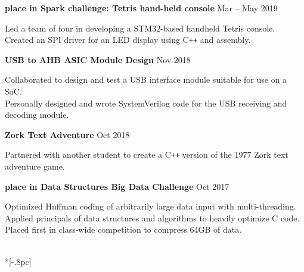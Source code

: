 \documentclass{article}
\begin{document}
\vspace{-5pt}
{\bf {} place in Spark challenge: Tetris hand-held console} \hfill Mar -- May 2019\\
\vspace{-10pt}
\begin{adjustwidth}{20pt}{}
Led a team of four in developing a STM32-based handheld Tetris console. Created an SPI driver for an LED display using C\texttt{++} and assembly.\\
\end{adjustwidth}
\vspace{-5pt}

\vspace{-5pt}
{\bf USB to AHB ASIC Module Design} \hfill Nov 2018\\
\vspace{-10pt}
\begin{adjustwidth}{20pt}{}
Collaborated to design and test a USB interface module suitable for use on a SoC.\\
Personally designed and wrote SystemVerilog code for the USB receiving and decoding module.\\
\end{adjustwidth}
\vspace{-5pt}

\vspace{-5pt}
{\bf Zork Text Adventure} \hfill Oct 2018\\
\vspace{-10pt}
\begin{adjustwidth}{20pt}{}
Partnered with another student to create a C\texttt{++} version of the 1977 Zork text adventure game.\\ 
\end{adjustwidth}
\vspace{-5pt}

\vspace{-5pt}
{\bf {} place in Data Structures Big Data Challenge} \hfill Oct 2017\\
\vspace{-10pt}
\begin{adjustwidth}{20pt}{}
Optimized Huffman coding of arbitrarily large data input with multi-threading. \\
Applied principals of data structures and algorithms to heavily optimize C code.\\
Placed first in class-wide competition to compress 64GB of data.
\end{adjustwidth}

\vspace{8pt}{\large \bf Work Experience} \\*[-.8pc]
\underline{\hspace{6in}}
\end{document}
